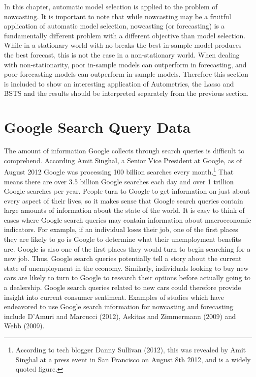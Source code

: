 In this chapter, automatic model selection is applied to the problem of nowcasting. It is important to note that while nowcasting may be a fruitful application of automatic model selection, nowcasting (or forecasting) is a fundamentally different problem with a different objective than model selection. While in a stationary world with no breaks the best in-sample model produces the best forecast, this is not the case in a non-stationary world. When dealing with non-stationarity, poor in-sample models can outperform in forecasting, and poor forecasting models can outperform in-sample models.  Therefore this section is included to show an interesting application of Autometrics, the Lasso and BSTS and the results should be interpreted separately from the previous section. 

\section{Google Search Query Data}

The amount of information Google collects through search queries is difficult to comprehend. According Amit Singhal, a Senior Vice President at Google, as of August 2012 Google was processing 100 billion searches every month.\footnote{According to tech blogger Danny Sullivan (2012), this was revealed by Amit Singhal at a press event in San Francisco on August 8th 2012, and is a widely quoted figure.} That means there are over 3.5 billion Google searches each day and over 1 trillion Google searches per year. People turn to Google to get information on just about every aspect of their lives, so it makes sense that Google search queries contain large amounts of information about the state of the world. It is easy to think of cases where Google search queries may contain information about macroeconomic indicators. For example, if an individual loses their job, one of the first places they are likely to go is Google to determine what their unemployment benefits are. Google is also one of the first places they would turn to begin searching for a new job. Thus, Google search queries potentially tell a story about the current state of unemployment in the economy. Similarly, individuals looking to buy new cars are likely to turn to Google to research their options before actually going to a dealership. Google search queries related to new cars could therefore provide insight into current consumer sentiment. Examples of studies which have endeavored to use Google search information for nowcasting and forecasting include D'Amuri and Marcucci (2012), Askitas and Zimmermann (2009) and Webb (2009). 

